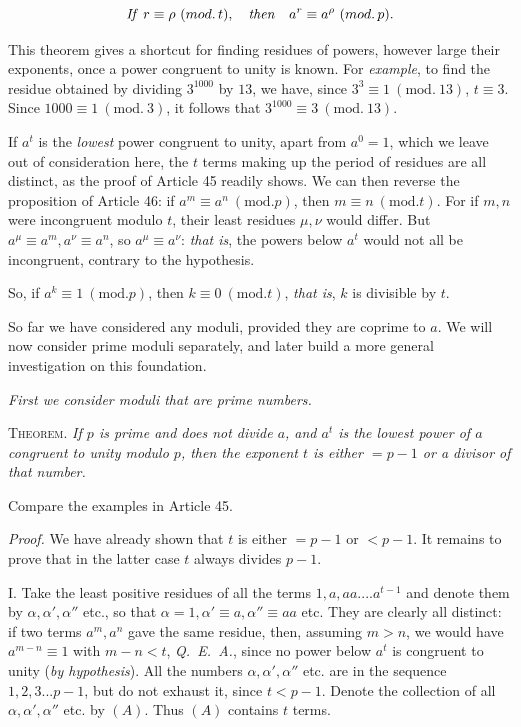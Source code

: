 \[\text{\emph{If }}r\equiv\rho\ (mod.\,t),\quad\text{\emph{then}}\quad a^r\equiv a^\rho\ (mod.\,p).\]


This theorem gives a shortcut for finding residues of powers, however large their exponents, once a power congruent to unity is known. For \emph{example}, to find the residue obtained by dividing $3^{1000}$ by $13$, we have, since $3^3\equiv1\ (\mathrm{mod.}\ 13)$, $t\equiv3$. Since $1000\equiv1\ (\mathrm{mod.}\ 3)$, it follows that $3^{1000}\equiv3\ (\mathrm{mod.}\ 13)$.


If $a^t$ is the \emph{lowest} power congruent to unity, apart from $a^0=1$, which we leave out of consideration here, the $t$ terms making up the period of residues are all distinct, as the proof of Article 45 readily shows. We can then reverse the proposition of Article 46: if $a^m\equiv a^n\ (\mathrm{mod.}p)$, then $m\equiv n\ (\mathrm{mod.}t)$. For if $m,n$ were incongruent modulo $t$, their least residues $\mu,\nu$ would differ. But $a^\mu\equiv a^m,a^\nu\equiv a^n$, so $a^\mu\equiv a^\nu$: \emph{that is}, the powers below $a^t$ would not all be incongruent, contrary to the hypothesis.

So, if $a^k\equiv1\ (\mathrm{mod.}p)$, then $k\equiv0\ (\mathrm{mod.}t)$, \emph{that is}, $k$ is divisible by $t$.

So far we have considered any moduli, provided they are coprime to $a$. We will now consider prime moduli separately, and later build a more general investigation on this foundation.

\begin{center}\small\emph{First we consider moduli that are prime numbers.}\end{center}


\textsc{Theorem.} \emph{If $p$ is prime and does not divide $a$, and $a^t$ is the lowest power of $a$ congruent to unity modulo $p$, then the exponent $t$ is either $=p-1$ or a divisor of that number.}

Compare the examples in Article 45.

\emph{Proof.} We have already shown that $t$ is either $=p-1$ or $<p-1$. It remains to prove that in the latter case $t$ always divides $p-1$.

I. Take the least positive residues of all the terms $1,a,aa....a^{t-1}$ and denote them by $\alpha,\alpha',\alpha''$ etc., so that $\alpha=1,\alpha'\equiv a,\alpha''\equiv aa$ etc. They are clearly all distinct: if two terms $a^m,a^n$ gave the same residue, then, assuming $m>n$, we would have $a^{m-n}\equiv1$ with $m-n<t$, \mbox{\emph{Q. E. A.}}, since no power below $a^t$ is congruent to unity (\emph{by hypothesis}). All the numbers $\alpha,\alpha',\alpha''$ etc. are in the sequence $1,2,3...p-1$, but do not exhaust it, since $t<p-1$. Denote the collection of all $\alpha,\alpha',\alpha''$ etc. by $(A)$. Thus $(A)$ contains $t$ terms.

